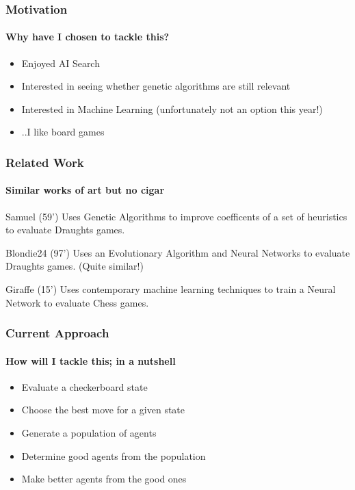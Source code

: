 \documentclass{beamer}
\begin{document}
\begin{frame}
	\frametitle{Motivation}
	\framesubtitle{Why have I chosen to tackle this?}

	\begin{itemize}
		\item Enjoyed AI Search
		\item Interested in seeing whether genetic algorithms are still relevant
		\item Interested in Machine Learning (unfortunately not an option this year!)
		\item ..I like board games
	\end{itemize}

\end{frame}

\begin{frame}
	\frametitle{Related Work}
	\framesubtitle{Similar works of art but no cigar}
	\begin{block}{Samuel (59')}
		Uses Genetic Algorithms to improve coefficents of a set of heuristics to evaluate Draughts games.
	\end{block}
	\begin{block}{Blondie24 (97')}
		Uses an Evolutionary Algorithm and Neural Networks to evaluate Draughts games. (Quite similar!)
	\end{block}

	 \begin{block}{Giraffe (15')}
		Uses contemporary machine learning techniques to train a Neural Network to evaluate Chess games.
	 \end{block}
\end{frame}

\begin{frame}
	\frametitle{Current Approach}
	\framesubtitle{How will I tackle this; in a nutshell}
	\begin{itemize}
		\item Evaluate a checkerboard state
		\item Choose the best move for a given state
		\item Generate a population of agents
		\item Determine good agents from the population
		\item Make better agents from the good ones
	\end{itemize}

\end{frame}
\end{document}
